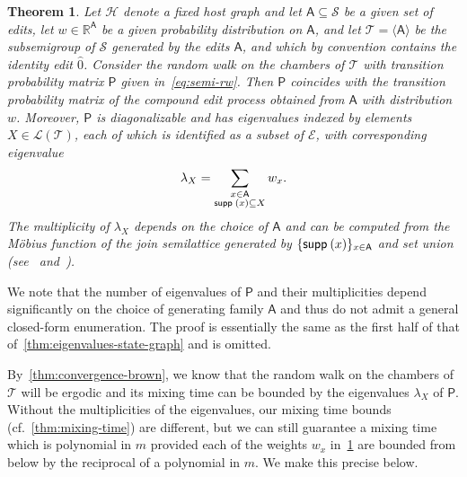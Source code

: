 \documentclass[11pt,a4paper]{article}
\newcommand{\supp}{{\mathsf{supp }\hspace{.075cm}}}
\newtheorem{theorem}{Theorem}[section]
\begin{document}
\begin{theorem}\label{thm:eigenvalues-subsemigroup}
    Let $\mathcal{H}$ denote a fixed host graph and let $\mathsf{A}\subseteq\mathcal{S}$ be a given set of edits, let $w\in\mathbb{R}^{\mathsf{A}}$ be a given probability distribution on $\mathsf{A}$, and let $\mathcal{T}=\langle \mathsf{A}\rangle$ be the subsemigroup of $\mathcal{S}$ generated by the edits $\mathsf{A}$, and which by convention contains the identity edit $\widehat{0}$. Consider the random walk on the chambers of $\mathcal{T}$ with transition probability matrix $\mathsf{P}$ given in~\cref{eq:semi-rw}. Then $\mathsf{P}$ coincides with the transition probability matrix of the compound edit process obtained from $\mathsf{A}$ with distribution $w$. Moreover, $\mathsf{P}$ is diagonalizable and has eigenvalues indexed by elements $X\in \mathcal{L}(\mathcal{T})$, each of which is identified as a subset of $\mathcal{E}$, with corresponding eigenvalue
        \begin{align*}
            \lambda_X = \sum_{\substack{x\in\mathsf{A} \\ \supp(x) \subseteq X}} w_x.
        \end{align*}
     The multiplicity of $\lambda_X$ depends on the choice of $\mathsf{A}$ and can be computed from the M\"obius function of the join semilattice generated by $\{\supp(x)\}_{x\in\mathsf{A}}$ and set union (see~\cite[Thm. 1]{brownSemigroupsRingsMarkov2000} and~\cite[Sec. 3.7]{stanley2011enumerative}).
\end{theorem}

We note that the number of eigenvalues of $\mathsf{P}$ and their multiplicities depend significantly on the choice of generating family $\mathsf{A}$ and thus do not admit a general closed-form enumeration. The proof is essentially the same as the first half of that of~\cref{thm:eigenvalues-state-graph} and is omitted.

By~\cref{thm:convergence-brown}, we know that the random walk on the chambers of $\mathcal{T}$ will be ergodic and its mixing time can be bounded by the eigenvalues $\lambda_X$ of $\mathsf{P}$. Without the multiplicities of the eigenvalues, our mixing time bounds (cf.~\cref{thm:mixing-time}) are different, but we can still guarantee a mixing time which is polynomial in $m$ provided each of the weights $w_x$ in~\cref{thm:eigenvalues-subsemigroup} are bounded from below by the reciprocal of a polynomial in $m$. We make this precise below.
\end{document}
